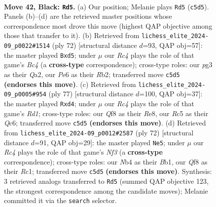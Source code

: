 \documentclass[11pt]{article}
\begin{document}
\begin{figure}[p]\centering
\begin{subfigure}{0.46\textwidth}\centering
\resizebox{\linewidth}{!}{%
\newchessgame
\chessboard[
  setfen={rnb2q2/1p4k1/4p3/p1r2pNp/PnN2P2/1P2Q1P1/4B1KP/3R3R b - - 4 42},
  showmover=false,
  pgfstyle=straightmove, color=movearrow, markmove={c5-d5}
]}
\caption{}
\end{subfigure}\hfill
\begin{subfigure}{0.46\textwidth}\centering
\resizebox{\linewidth}{!}{%
\newchessgame
\chessboard[
  setfen={r6r/2pb1pk1/p2p2q1/P2np2n/2B1P3/2PP2pP/QR4P1/4RNK1 w - - 0 37},
  showmover=false,
  pgfstyle=straightmove, color=movearrow, markmove={c4-d5}
]}
\caption{}
\end{subfigure}
\\[4pt]
\begin{subfigure}{0.46\textwidth}\centering
\resizebox{\linewidth}{!}{%
\newchessgame
\chessboard[
  setfen={3rr1k1/4bp2/1pq1p1pp/1Nn5/pBPR4/P6P/1P2QPP1/4R1K1 b - - 5 39},
  showmover=false,
  pgfstyle=straightmove, color=movearrow, markmove={d8-d4}
]}
\caption{}
\end{subfigure}\hfill
\begin{subfigure}{0.46\textwidth}\centering
\resizebox{\linewidth}{!}{%
\newchessgame
\chessboard[
  setfen={5rk1/n4pp1/1p1bpq1p/pP6/PnRP4/4QN1P/5PP1/1BR2K2 w - - 15 37},
  showmover=false,
  pgfstyle=straightmove, color=movearrow, markmove={f3-e5}
]}
\caption{}
\end{subfigure}
\caption{\textbf{Move 42, Black: \texttt{Rd5}.} (a) Our position; Melanie plays \texttt{Rd5} (\texttt{c5d5}). Panels (b)--(d) are the retrieved master positions whose correspondence most drove this move (highest QAP objective among those that transfer to it). (b) Retrieved from \texttt{lichess\_elite\_2024-09\_p0022\#1514} (ply 72) [structural distance $d$=93, QAP obj=57]: the master played \texttt{Bxd5}; under $\mu$ our \emph{Rc4} plays the role of that game's \emph{Bc4} (a \textbf{cross-type} correspondence); cross-type roles: our \emph{p}g3 as their \emph{Q}a2, our \emph{P}e6 as their \emph{R}b2; transferred move \texttt{c5d5} \textbf{(endorses this move)}. (c) Retrieved from \texttt{lichess\_elite\_2024-09\_p0005\#954} (ply 77) [structural distance $d$=100, QAP obj=37]: the master played \texttt{Rxd4}; under $\mu$ our \emph{Rc4} plays the role of that game's \emph{Rd1}; cross-type roles: our \emph{Q}f8 as their \emph{R}e8, our \emph{R}c5 as their \emph{Q}c6; transferred move \texttt{c5d5} \textbf{(endorses this move)}. (d) Retrieved from \texttt{lichess\_elite\_2024-09\_p0012\#2587} (ply 72) [structural distance $d$=91, QAP obj=29]: the master played \texttt{Ne5}; under $\mu$ our \emph{Rc4} plays the role of that game's \emph{Nf3} (a \textbf{cross-type} correspondence); cross-type roles: our \emph{N}b4 as their \emph{B}b1, our \emph{Q}f8 as their \emph{R}c1; transferred move \texttt{c5d5} \textbf{(endorses this move)}. Synthesis: 3 retrieved analogs transferred to \texttt{Rd5} (summed QAP objective 123, the strongest correspondence among the candidate moves); Melanie committed it via the \texttt{search} selector.}
\label{fig:thought-m83}
\end{figure}
\end{document}
